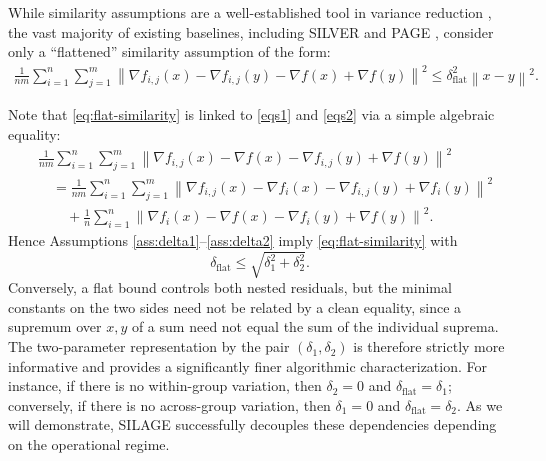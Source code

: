 \documentclass{article}
\newcommand{\sqn}[1]{\left\| #1 \right\|^2}
\theoremstyle{plain}
\newcommand{\algname}[1]{{\sf\scalefont{0.88}\color{mydarkgreen}#1}\xspace}
\def\algname#1{#1}%
\newcommand{\squeeze}{\textstyle}
\begin{document}
While similarity assumptions are a well-established tool in variance reduction \citep{karimireddy2020mime, oko24}, the vast majority of existing baselines, including \algname{SILVER} \citep{oko24} and \algname{PAGE} \citep{PAGE-AB}, consider only a ``flattened'' similarity assumption of the form:
\begin{align}
    \frac1{nm}\sum_{i=1}^n\sum_{j=1}^m
    \sqn{\nabla f_{i,j}(x)-\nabla f_{i,j}(y)-\nabla f(x)+\nabla f(y)}
    \le \delta_{\mathrm{flat}}^2\sqn{x-y}.
    \label{eq:flat-similarity}
\end{align}

Note that \eqref{eq:flat-similarity} is linked to \eqref{eqs1} and \eqref{eqs2} via a simple algebraic equality:
\begin{align*}
    &\frac{1}{nm}\sum_{i=1}^n \sum_{j=1}^m \sqn{\nabla f_{i,j}(x)-\nabla f(x)-\nabla f_{i,j}(y)+\nabla f(y)} \\
    &\quad= \frac{1}{nm}\sum_{i=1}^n \sum_{j=1}^m \sqn{\nabla f_{i,j}(x)-\nabla f_i(x)-\nabla f_{i,j}(y)+\nabla f_i(y)} \\
    &\qquad+ \frac{1}{n}\sum_{i=1}^n\sqn{\nabla f_{i}(x)-\nabla f(x)-\nabla f_{i}(y)+\nabla f(y)} .
\end{align*}
Hence Assumptions \ref{ass:delta1}--\ref{ass:delta2} imply \eqref{eq:flat-similarity} with
\begin{equation*}
\delta_{\mathrm{flat}} \le \sqrt{\delta_1^2+\delta_2^2}.
\end{equation*}
Conversely, a flat bound controls both nested residuals, but the minimal constants on the two sides need not be related by a clean equality, since a supremum over $x,y$ of a sum need not equal the sum of the individual suprema. The two-parameter representation by the pair $(\delta_1,\delta_2)$ is therefore strictly more informative and provides a significantly finer algorithmic characterization. For instance, if there is no within-group variation, then $\delta_2=0$ and $\delta_{\mathrm{flat}}=\delta_1$; conversely, if there is no across-group variation, then $\delta_1=0$ and $\delta_{\mathrm{flat}}=\delta_2$. As we will demonstrate, \algname{SILAGE} successfully decouples these dependencies depending on the operational regime.
\end{document}
